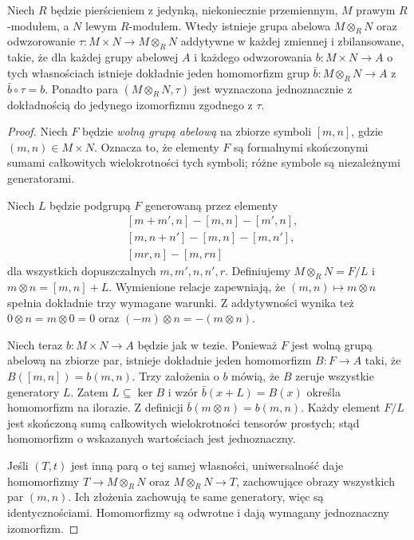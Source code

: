 \begin{twierdzenie}
\label{aa:tw:tensor-universal}
Niech $R$ będzie pierścieniem z jedynką, niekoniecznie
przemiennym, $M$ prawym $R$-modułem, a $N$ lewym
$R$-modułem. Wtedy istnieje grupa abelowa $M\otimes_R N$ oraz odwzorowanie
$\tau:M\times N\to M\otimes_R N$ addytywne w każdej
zmiennej i zbilansowane, takie, że dla każdej grupy abelowej
$A$ i każdego odwzorowania $b:M\times N\to A$ o tych
własnościach istnieje dokładnie jeden homomorfizm grup
$\bar b:M\otimes_R N\to A$ z $\bar b\circ\tau=b$.
Ponadto para $(M\otimes_RN,\tau)$ jest wyznaczona
jednoznacznie z dokładnością do jedynego izomorfizmu
zgodnego z $\tau$.
\end{twierdzenie}
\begin{proof}
Niech $F$ będzie \emph{wolną grupą abelową} na zbiorze
symboli $[m,n]$, gdzie $(m,n)\in M\times N$.
Oznacza to, że elementy $F$ są formalnymi skończonymi
sumami całkowitych wielokrotności tych symboli; różne
symbole są niezależnymi generatorami.

Niech $L$ będzie podgrupą $F$ generowaną przez elementy
\[
\begin{split}
 &[m+m',n]-[m,n]-[m',n],\\
 &[m,n+n']-[m,n]-[m,n'],\\
 &[mr,n]-[m,rn]
\end{split}
\]
dla wszystkich dopuszczalnych $m,m',n,n',r$.
Definiujemy $M\otimes_RN=F/L$ i
$m\otimes n=[m,n]+L$. Wymienione relacje zapewniają,
że $(m,n)\mapsto m\otimes n$ spełnia dokładnie
trzy wymagane warunki. Z addytywności wynika też
$0\otimes n=m\otimes0=0$ oraz
$(-m)\otimes n=-(m\otimes n)$.

Niech teraz $b:M\times N\to A$ będzie jak w tezie.
Ponieważ $F$ jest wolną grupą abelową na zbiorze par,
istnieje dokładnie jeden homomorfizm $B:F\to A$
taki, że $B([m,n])=b(m,n)$. Trzy założenia o $b$
mówią, że $B$ zeruje wszystkie generatory $L$.
Zatem $L\subseteq\ker B$ i wzór
$\bar b(x+L)=B(x)$ określa homomorfizm na ilorazie.
Z definicji $\bar b(m\otimes n)=b(m,n)$.
Każdy element $F/L$ jest skończoną sumą całkowitych
wielokrotności tensorów prostych; stąd homomorfizm
o wskazanych wartościach jest jednoznaczny.

Jeśli $(T,t)$ jest inną parą o tej samej własności,
uniwersalność daje homomorfizmy $T\to M\otimes_RN$
oraz $M\otimes_RN\to T$, zachowujące obrazy wszystkich
par $(m,n)$. Ich złożenia zachowują te same generatory,
więc są identycznościami. Homomorfizmy są odwrotne
i dają wymagany jednoznaczny izomorfizm.
\end{proof}

